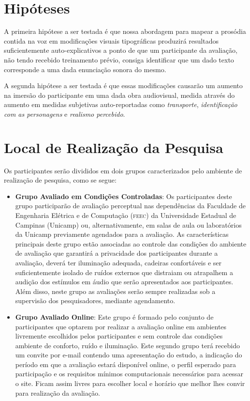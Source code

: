 \documentclass[a4paper,11pt,titlepage,singlespacing]{article}
\begin{document}
\section{Hipóteses}

\noindent A primeira hipótese a ser testada é que nossa abordagem para mapear a prosódia contida na voz em modificações visuais tipográficas produzirá resultados suficientemente auto-explicativos a ponto de que um participante da avaliação, não tendo recebido treinamento prévio, consiga identificar que um dado texto corresponde a uma dada enunciação sonora do mesmo.

A segunda hipótese a ser testada é que essas modificações causarão um aumento na imersão do participante em uma dada obra audiovisual, medida através do aumento em medidas subjetivas auto-reportadas como \textit{transporte}, \textit{identificação com as personagens} e \textit{realismo percebido}.

\section{Local de Realização da Pesquisa}

\noindent Os participantes serão divididos em dois grupos caracterizados pelo ambiente de realização de pesquisa, como se segue:

\begin{itemize}
    \item \textbf{Grupo Avaliado em Condições Controladas}: Os participantes deste grupo participarão de avaliação perceptual nas dependências da Faculdade de Engenharia Elétrica e de Computação (\textsc{feec}) da Universidade Estadual de Campinas (Unicamp) ou, alternativamente, em salas de aula ou laboratórios da Unicamp previamente agendados para a avaliação. As características principais deste grupo estão associadas ao controle das condições do ambiente de avaliação que garantirá a privacidade dos participantes durante a avaliação, deverá ter iluminação adequada, cadeiras confortáveis e ser suficientemente isolado de ruídos externos que distraiam ou atrapalhem a audição dos estímulos em áudio que serão apresentados aos participantes. Além disso, neste grupo as avaliações serão sempre realizadas sob a supervisão dos pesquisadores, mediante agendamento. 
    \item \textbf{Grupo Avaliado Online}: Este grupo é formado pelo conjunto de participantes que optarem por realizar a avaliação online em ambientes livremente escolhidos pelos participantes e sem controle das condições ambiente de conforto, ruído e iluminação. Este segundo grupo terá recebido um convite por e-mail contendo uma apresentação do estudo, a indicação do período em que a avaliação estará disponível online, o perfil esperado para participação e os requisitos mínimos computacionais necessários para acessar o site. Ficam assim livres para escolher local e horário que melhor lhes convir para realização da avaliação.
\end{itemize}
\end{document}
